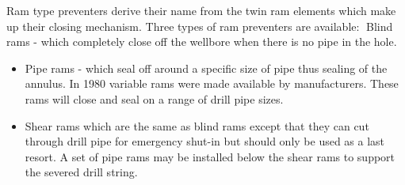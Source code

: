  Ram type preventers derive their name
from the twin ram elements which make up their closing
mechanism. Three types of ram preventers are available: Blind rams - which completely close off the wellbore when
there is no pipe in the hole.

\vspace{1em}

\begin{itemize}

\item Pipe rams - which seal off around a specific size of pipe thus
sealing of the annulus. In 1980 variable rams were made
available by manufacturers. These rams will close and seal on a
range of drill pipe sizes.

\vspace{1em}

\item Shear rams which are the same as blind rams except that they
can cut through drill pipe for emergency shut-in but should only
be used as a last resort. A set of pipe rams may be installed
below the shear rams to support the severed drill string.

\end{itemize}





